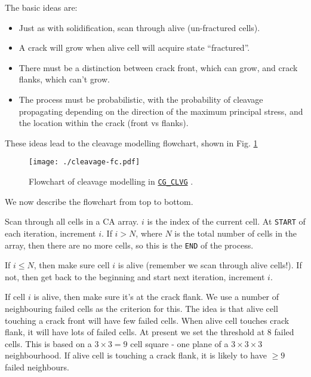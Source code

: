 The basic ideas are:

\begin{itemize}

\item

Just as with solidification, scan through alive (un-fractured cells).

\item

A crack will grow when alive cell will acquire state ``fractured''.

\item

There must be a distinction between crack front, which can grow,
and crack flanks, which can't grow.

\item

The process must be probabilistic, with the probability of cleavage
propagating depending on the direction of the maximum principal
stress, and the location within the crack (front vs flanks).

\end{itemize}

These ideas lead to the cleavage modelling flowchart, shown
in Fig. \ref{fig:cl:fc}

\begin{figure}[htb]
\centering
\texttt{[image: ./cleavage-fc.pdf]}
\caption{Flowchart of cleavage modelling in
\hyperref[sec:cg_clvg]{\texttt{CG\_CLVG}} 
.}
\label{fig:cl:fc}
\end{figure}

We now describe the flowchart from top to bottom.

Scan through all cells in a CA array. $i$ is the index of the
current cell. At \texttt{START} of each iteration, increment $i$.
If $i>N$, where $N$ is the total number of cells in the array,
then there are no more cells, so this is the \texttt{END} of the process. 

If $i\le N$, then make sure cell $i$ is alive (remember we scan
through alive cells!). If not, then get back to the beginning
and start next iteration, increment $i$.

If cell $i$ is alive,
then make sure it's at the crack flank.
We use a number of neighbouring failed cells as the criterion
for this. The idea is that alive cell touching a crack front
will have few failed cells. When alive cell touches crack
flank, it will have lots of failed cells. At present we set
the threshold at 8 failed cells. This is based on a $3\times3=9$ cell
square - one plane of a $3\times 3 \times 3$ neighbourhood.
If alive cell is touching a crack flank, it is likely to 
have $\geq 9$ failed neighbours.

